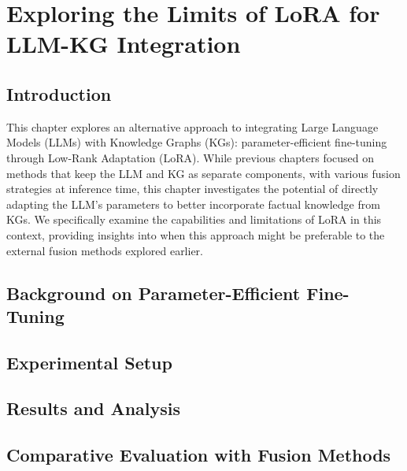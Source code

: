 \chapter{Exploring the Limits of LoRA for LLM-KG Integration}
\label{chap:lora_limits}

\section{Introduction}
\label{sec:lora:intro}
This chapter explores an alternative approach to integrating Large Language Models (LLMs) with Knowledge Graphs (KGs): parameter-efficient fine-tuning through Low-Rank Adaptation (LoRA). While previous chapters focused on methods that keep the LLM and KG as separate components, with various fusion strategies at inference time, this chapter investigates the potential of directly adapting the LLM's parameters to better incorporate factual knowledge from KGs. We specifically examine the capabilities and limitations of LoRA in this context, providing insights into when this approach might be preferable to the external fusion methods explored earlier.

\section{Background on Parameter-Efficient Fine-Tuning}
\label{sec:lora:background}

\section{Experimental Setup}
\label{sec:lora:setup}

\section{Results and Analysis}
\label{sec:lora:results}

\section{Comparative Evaluation with Fusion Methods}
\label{sec:lora:comparison}

